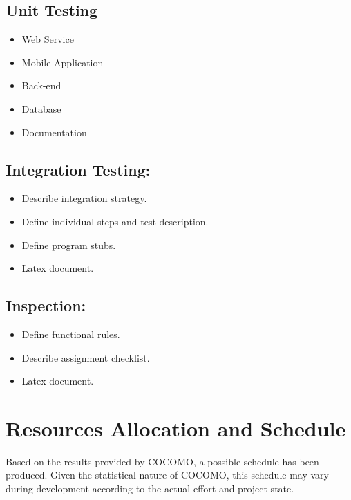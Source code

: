 \documentclass[11pt, a4paper,titlepage]{article}
\begin{document}
	\subsection{Unit Testing}
	\begin{itemize}
		\item Web Service
		\item Mobile Application
		\item Back-end
		\item Database
		\item Documentation
	\end{itemize}
	
		
		\subsection{Integration Testing:}
		\begin{itemize}
			\item Describe integration strategy.
			\item Define individual steps and test description.
			\item Define program stubs.
			\item Latex document.
		\end{itemize}
	
	
	\subsection{Inspection:}
	\begin{itemize}
		\item Define functional rules.
		\item Describe assignment checklist.
		\item Latex document.
	\end{itemize}
	\newpage
	\section{Resources Allocation and Schedule}
	Based on the results provided by COCOMO, a possible schedule has been produced. \newline
	Given the statistical nature of COCOMO, this schedule may vary during development according to the actual effort and project state. \newline
	
\end{document}
